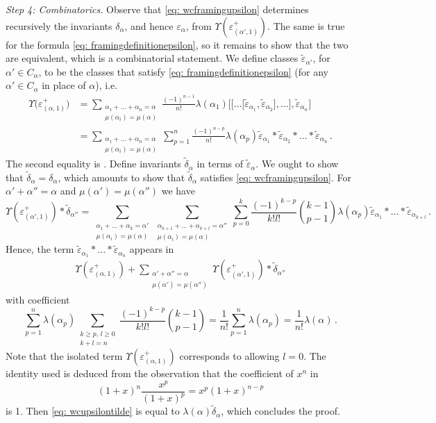\documentclass[12pt]{amsart}
\theoremstyle{definition}
\newcommand{\1}{\mathbf 1}
\begin{document}
\textit{Step 4: Combinatorics.}
Observe that \eqref{eq: wcframingupsilon} determines recursively the invariants $\delta_\alpha$, and hence $\varepsilon_\alpha$, from $\Upsilon(\varepsilon_{(\alpha',1)}^+)$. The same is true for the formula \eqref{eq: framingdefinitionepsilon}, so it remains to show that the two are equivalent, which is a combinatorial statement. We define classes $\tilde \varepsilon_{\alpha'}$, for $\alpha'\in C_\alpha$, to be the classes that satisfy \eqref{eq: framingdefinitionepsilon} (for any $\alpha'\in C_\alpha$ in place of $\alpha$), i.e.
\begin{align*}
       \Upsilon\big(\varepsilon_{(\alpha, 1)}^{+}\big)&=\sum_{\substack{\alpha_{1}+\ldots+\alpha_n=\alpha\\
        \mu(\alpha_i)=\mu(\alpha)}}\frac{(-1)^{n-1}}{n!}\lambda(\alpha_1)\big[\big[\ldots\big[\tilde \varepsilon_{\alpha_1},\tilde \varepsilon_{\alpha_2}\big],\ldots\big], \tilde \varepsilon_{\alpha_n}\big]\\
        &=\sum_{\substack{\alpha_{1}+\ldots+\alpha_n=\alpha\\
        \mu(\alpha_i)=\mu(\alpha)}}\sum_{p=1}^n\frac{(-1)^{n-p}}{n!}\lambda(\alpha_p)\tilde \varepsilon_{\alpha_1}\ast  \tilde\varepsilon_{\alpha_2}\ast\ldots\ast \tilde \varepsilon_{\alpha_n}\,.
\end{align*}
The second equality is \cite[(9.54)]{joyce}. Define invariants $\tilde \delta_\alpha$ in terms of $\tilde \varepsilon_\alpha$. We ought to show that $\tilde \delta_{\alpha}=\delta_\alpha$, which amounts to show that $\tilde \delta_\alpha$ satisfies \eqref{eq: wcframingupsilon}. For $\alpha'+\alpha''=\alpha$ and $\mu(\alpha')=\mu(\alpha'')$ we have
\[\Upsilon(\varepsilon_{(\alpha',1)}^+) * \tilde \delta_{\alpha''}=\sum_{\substack{\alpha_{1}+\ldots+\alpha_k=\alpha'\\
        \mu(\alpha_i)=\mu(\alpha)}} \sum_{\substack{\alpha_{k+1}+\ldots+\alpha_{k+l}=\alpha''\\
        \mu(\alpha_i)=\mu(\alpha)}}\sum_{p=0}^k\frac{(-1)^{k-p}}{k!l!}\binom{k-1}{p-1}\lambda(\alpha_p)\tilde \varepsilon_{\alpha_1}\ast \ldots\ast\tilde \varepsilon_{\alpha_{k+l}}\,.\]
Hence, the term $\tilde \varepsilon_{\alpha_1}\ast \ldots\ast\tilde \varepsilon_{\alpha_{n}}$ appears in 
\begin{align}\label{eq: wcupsilontilde}\Upsilon(\varepsilon_{(\alpha,1)}^+) +\sum_{\substack{\alpha'+\alpha''=\alpha\\
\mu(\alpha')=\mu(\alpha'')}} \Upsilon(\varepsilon_{(\alpha',1)}^+) * \tilde \delta_{\alpha''}
\end{align}
with coefficient
\[\sum_{p=1}^n \lambda(\alpha_p)\sum_{\substack{k\geq p, \,l\geq 0\\k+l=n}}\frac{(-1)^{k-p}}{k!l!}\binom{k-1}{p-1}=\frac{1}{n!}\sum_{p=1}^n\lambda(\alpha_p)=\frac{1}{n!}\lambda(\alpha)\,.\]
Note that the isolated term $\Upsilon(\varepsilon_{(\alpha,1)}^+)$ corresponds to allowing $l=0$. The identity used is deduced from the observation that the coefficient of $x^n$ in
\[(1+x)^n\frac{x^p}{(1+x)^p}=x^p(1+x)^{n-p}\]
is 1. Then \eqref{eq: wcupsilontilde} is equal to $\lambda(\alpha)\tilde \delta_\alpha$, which concludes the proof.
\end{document}
